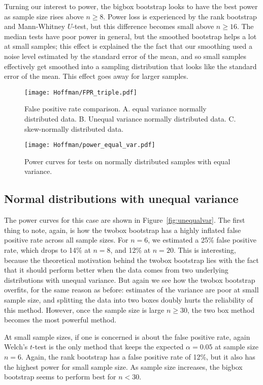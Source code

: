 \documentclass[10pt]{article} %
\begin{document}
Turning our interest to power, the bigbox bootstrap looks to have the best power as sample size rises above $n\geq8$. Power loss is experienced by the rank bootstrap and Mann-Whitney $U$-test, but this difference becomes small above $n\geq16$. The median tests have poor power in general, but the smoothed bootstrap helps a lot at small samples; this effect is explained the the fact that our smoothing used a noise level estimated by the standard error of the mean, and so small samples effectively get smoothed into a sampling distribution that looks like the standard error of the mean. This effect goes away for larger samples.

\begin{figure}
  \texttt{[image: Hoffman/FPR\_triple.pdf]}
  \caption{False positive rate comparison. A. equal variance normally distributed data. B. Unequal variance normally distributed data. C. skew-normally distributed data.}
  \label{fig:equalvarr_fpr}
\end{figure}

\begin{figure}
  \texttt{[image: Hoffman/power\_equal\_var.pdf]}
  \caption{Power curves for tests on normally distributed samples with equal variance.}
  \label{fig:equalvar}
\end{figure}





\subsection{Normal distributions with unequal variance}
The power curves for this case are shown in Figure~\ref{fig:unequalvar}. The first thing to note, again, is how the twobox bootstrap has a highly inflated false positive rate across all sample sizes. For $n=6$, we estimated a 25\% false positive rate, which drops to 14\% at $n=8$, and 12\% at $n=20$. This is interesting, because the theoretical motivation behind the twobox bootstrap lies with the fact that it should perform better when the data comes from two underlying distributions with unequal variance. But again we see how the twobox bootstrap overfits, for the same reason as before: estimates of the variance are poor at small sample size, and splitting the data into two boxes doubly hurts the reliability of this method. However, once the sample size is large $n\geq 30$, the two box method becomes the most powerful method.

At small sample sizes, if one is concerned is about the false positive rate, again Welch's $t$-test is the only method that keeps the expected $\alpha=0.05$ at sample size $n=6$. Again, the rank bootstrap has a false positive rate of 12\%, but it also has the highest power for small sample size. As sample size increases, the bigbox bootstrap seems to perform best for $n<30$. 
\end{document}
